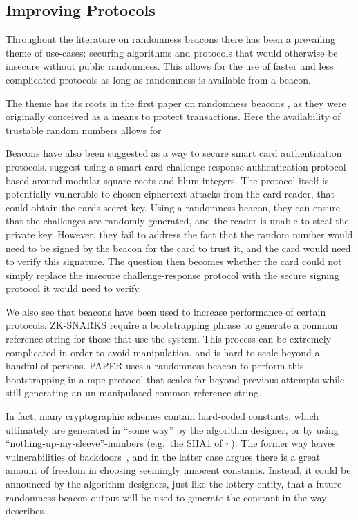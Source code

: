 \subsection{Improving Protocols}
Throughout the literature on randomness beacons there has been a prevailing theme of use-cases: securing algorithms and protocols that would otherwise be insecure without public randomness. This allows for the use of faster and less complicated protocols as long as randomness is available from a beacon.

The theme has its roots in the first paper on randomness beacons \cite{rabin1983transaction}, as they were originally conceived as a means to protect transactions. Here the availability of trustable random numbers allows for

Beacons have also been suggested as a way to secure smart card authentication protocols. \citet{fischer2011publicrandomnessservice} suggest using a smart card challenge-response authentication protocol based around modular square roots and blum integers. The protocol itself is potentially vulnerable to chosen ciphertext attacks from the card reader, that could obtain the cards secret key. Using a randomness beacon, they can ensure that the challenges are randomly generated, and the reader is unable to steal the private key. However, they fail to address the fact that the random number would need to be signed by the beacon for the card to trust it, and the card would need to verify this signature. The question then becomes whether the card could not simply replace the insecure challenge-response protocol with the secure signing protocol it would need to verify.

We also see that beacons have been used to increase performance of certain protocols. ZK-SNARKS require a bootstrapping phrase to generate a common reference string for those that use the system. This process can be extremely complicated in order to avoid manipulation, and is hard to scale beyond a handful of persons. PAPER uses a randomness beacon to perform this bootstrapping in a mpc protocol that scales far beyond previous attempts while still generating an un-manipulated common reference string.

In fact, many cryptographic schemes contain hard-coded constants, which ultimately are generated in \enquote{some way} by the algorithm designer, or by using \enquote{nothing-up-my-sleeve}-numbers (e.g.\ the SHA1 of $\pi$).
The former way leaves vulnerabilities of backdoors~, and in the latter case  argues there is a great amount of freedom in choosing seemingly innocent constants.
Instead, it could be announced by the algorithm designers, just like the lottery entity, that a future randomness beacon output will be used to generate the constant in the way  describes.